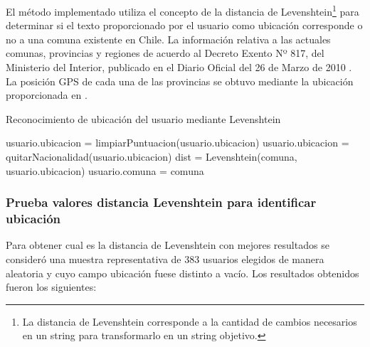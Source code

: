 El método implementado utiliza el concepto de la distancia de Levenshtein\footnote{La distancia de Levenshtein corresponde a la cantidad de cambios necesarios en un string para transformarlo en un string objetivo.} para determinar si el texto proporcionado por el usuario como ubicación corresponde o no a una comuna existente en Chile. La información relativa a las actuales comunas, provincias y regiones de acuerdo al Decreto Exento Nº 817, del Ministerio del Interior, publicado en el Diario Oficial del 26 de Marzo de 2010 \cite{listaCodigosProvincias}. La posición GPS de cada una de las provincias se obtuvo mediante la ubicación proporcionada en \cite{dicesmapas}.

\begin{algorithm}
	\caption{Reconocimiento de ubicación del usuario mediante Levenshtein}\label{ciudadesLeven2}
	\begin{algorithmic}[1]
		\State usuario.ubicacion = limpiarPuntuacion(usuario.ubicacion)\;
		\State usuario.ubicacion = quitarNacionalidad(usuario.ubicacion)\;
		\State dist = Levenshtein(comuna, usuario.ubicacion)\;
		\State usuario.comuna = comuna\;
		\EndIf
		\EndFor
		\EndFor
		\EndFunction
	\end{algorithmic}
\end{algorithm}


\subsubsection{Prueba valores distancia Levenshtein para identificar ubicación}

Para obtener cual es la distancia de Levenshtein con mejores resultados se consideró una muestra representativa de 383 usuarios elegidos de manera aleatoria y cuyo campo ubicación fuese distinto a vacío. Los resultados obtenidos fueron los siguientes:

